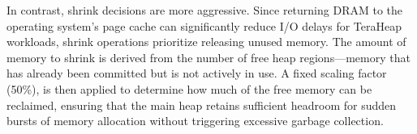 In contrast, shrink decisions are more aggressive. Since returning DRAM to the
operating system's page cache can significantly reduce I/O delays for TeraHeap
workloads, shrink operations prioritize releasing unused memory. The amount of
memory to shrink is derived from the number of free heap regions—memory that
has already been committed but is not actively in use. A fixed scaling factor
(50\%), is then applied to determine how much of the free memory can be
reclaimed, ensuring that the main heap retains sufficient headroom for sudden
bursts of memory allocation without triggering excessive garbage collection.


